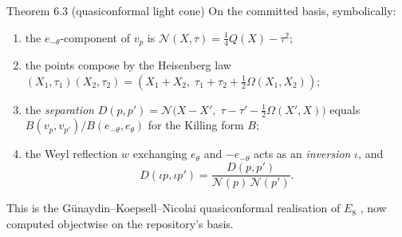 \begin{result}{Theorem 6.3 (quasiconformal light cone) \hfill \tierC}
On the committed basis, symbolically:
\begin{enumerate}[label=(\roman*),leftmargin=1.5em]
\item the $e_{-\theta}$-component of $v_p$ is $\mathcal N(X,\tau)=\tfrac14Q(X)-\tau^2$;
\item the points compose by the Heisenberg law
      $(X_1,\tau_1)(X_2,\tau_2)=(X_1+X_2,\;\tau_1+\tau_2+\tfrac12\Omega(X_1,X_2))$;
\item the \emph{separation} $D(p,p')=\mathcal N\bigl(X-X',\;\tau-\tau'-\tfrac12\Omega(X',X)\bigr)$
      equals $B(v_p,v_{p'})/B(e_{-\theta},e_\theta)$ for the Killing form $B$;
\item the Weyl reflection $w$ exchanging $e_\theta$ and $-e_{-\theta}$ acts as an
      \emph{inversion} $\iota$, and
      \[
      D(\iota p,\iota p')=\frac{D(p,p')}{\mathcal N(p)\,\mathcal N(p')} .
      \]
\end{enumerate}
This is the G\"unaydin--Koepsell--Nicolai quasiconformal realisation of $E_8$
\cite{GKN}, now computed objectwise on the repository's basis.
\end{result}


